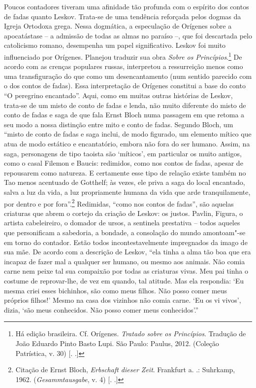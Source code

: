Poucos contadores tiveram uma afinidade tão profunda com o espírito dos
contos de fadas quanto Leskov. Trata-se de uma tendência reforçada pelos
dogmas da Igreja Ortodoxa grega. Nessa dogmática, a especulação de
Orígenes sobre a apocatástase -- a admissão de todas as almas no paraíso
--, que foi descartada pelo catolicismo romano, desempenha um papel
significativo. Leskov foi muito influenciado por Orígenes. Planejou
traduzir sua obra \emph{Sobre os Princípios}.\footnote{Há edição brasileira. Cf. Orígenes. \emph{Tratado sobre os
Princípios}. Tradução de João Eduardo Pinto Basto Lupi. São Paulo: Paulus, 2012.
  (Coleção Patrística, v. 30) [. .]} De acordo com as
crenças populares russas, interpretou a ressurreição menos como uma
transfiguração do que como um desencantamento (num sentido parecido com
o dos contos de fadas). Essa interpretação de Orígenes constitui a base
do conto ``O peregrino encantado''. Aqui, como em muitas outras
histórias de Leskov, trata-se de um misto de conto de fadas e lenda, não
muito diferente do misto de conto de fadas e saga de que fala Ernst
Bloch numa passagem em que retoma a seu modo a nossa distinção entre
mito e conto de fadas. Segundo Bloch, um ``misto de conto de fadas e
saga inclui, de modo figurado, um elemento mítico que atua de modo
estático e encantatório, embora não fora do ser humano. Assim, na saga,
personagens de tipo taoista são `míticos', em particular os muito
antigos, como o casal Filemon e Baucis: redimidos, como nos contos de
fadas, apesar de repousarem como natureza. E certamente esse tipo de
relação existe também no Tao menos acentuado de Gotthelf; às vezes, ele
priva a saga do local encantado, salva a luz da vida, a luz propriamente
humana da vida que arde tranquilamente, por dentro e por
fora''.\footnote{Citação de Ernst Bloch, \emph{Erbschaft dieser Zeit}.
  Frankfurt a. .: Suhrkamp, 1962. (\emph{Gesammtausgabe}, v. 4) [.
  .]} Redimidas, ``como nos contos de fadas'', são aquelas
criaturas que abrem o cortejo da criação de Leskov: os justos. Pavlin,
Figura, o artista cabeleireiro, o domador de ursos, a sentinela
prestativa -- todos aqueles que personificam a sabedoria, a bondade, a
consolação do mundo amontoam"-se em torno do contador. Estão todos
incontestavelmente impregnados da imago de sua mãe. De acordo com a
descrição de Leskov, ``ela tinha a alma tão boa que era incapaz de fazer
mal a qualquer ser humano, ou mesmo aos animais. Não comia carne nem
peixe tal sua compaixão por todas as criaturas vivas. Meu pai tinha o
costume de reprovar-lhe, de vez em quando, tal atitude. Mas ela
respondia: `Eu mesma criei esses bichinhos, são como meus filhos. Não
posso comer meus próprios filhos!' Mesmo na casa dos vizinhos não comia
carne. `Eu os vi vivos', dizia, `são meus conhecidos. Não posso comer
meus conhecidos'.''

